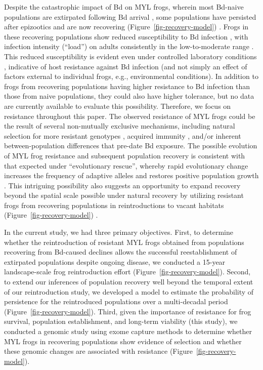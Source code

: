 \documentclass[
  letterpaper,
  DIV=11,
  numbers=noendperiod]{scrartcl}
\begin{document}
Despite the catastrophic impact of Bd on MYL frogs, wherein most
Bd-naive populations are extirpated following Bd arrival
\citep{vredenburg2010}, some populations have persisted after epizootics
\citep[during which Bd infection intensity on frogs is very
high,][]{briggs2010} and are now recovering
(Figure~\ref{fig-recovery-model}) \citep{knapp2016}. Frogs in these
recovering populations show reduced susceptibility to Bd infection
\citep{knapp2016}, with infection intensity (``load'') on adults
consistently in the low-to-moderate range
\citep{briggs2010, knapp2011, joseph2018}. This reduced susceptibility
is evident even under controlled laboratory conditions
\citep{knapp2016}, indicative of host resistance against Bd infection
(and not simply an effect of factors external to individual frogs, e.g.,
environmental conditions). In addition to frogs from recovering
populations having higher resistance to Bd infection than those from
naive populations, they could also have higher tolerance, but no data
are currently available to evaluate this possibility. Therefore, we
focus on resistance throughout this paper. The observed resistance of
MYL frogs could be the result of several non-mutually exclusive
mechanisms, including natural selection for more resistant genotypes
\citep{savage2016, grogan2018b}, acquired immunity \citep{grogan2018a},
and/or inherent between-population differences that pre-date Bd
exposure. The possible evolution of MYL frog resistance and subsequent
population recovery is consistent with that expected under
``evolutionary rescue'', whereby rapid evolutionary change increases the
frequency of adaptive alleles and restores positive population growth
\citep{carlson2014, searle2020}. This intriguing possibility also
suggests an opportunity to expand recovery beyond the spatial scale
possible under natural recovery by utilizing resistant frogs from
recovering populations in reintroductions to vacant habitats
(Figure~\ref{fig-recovery-model}) \citep{joseph2018, mendelson2019}.

In the current study, we had three primary objectives. First, to
determine whether the reintroduction of resistant MYL frogs obtained
from populations recovering from Bd-caused declines allows the
successful reestablishment of extirpated populations despite ongoing
disease, we conducted a 15-year landscape-scale frog reintroduction
effort (Figure~\ref{fig-recovery-model}). Second, to extend our
inferences of population recovery well beyond the temporal extent of our
reintroduction study, we developed a model to estimate the probability
of persistence for the reintroduced populations over a multi-decadal
period (Figure~\ref{fig-recovery-model}). Third, given the importance of
resistance for frog survival, population establishment, and long-term
viability (this study), we conducted a genomic study using exome capture
methods to determine whether MYL frogs in recovering populations show
evidence of selection and whether these genomic changes are associated
with resistance (Figure~\ref{fig-recovery-model}).
\end{document}
